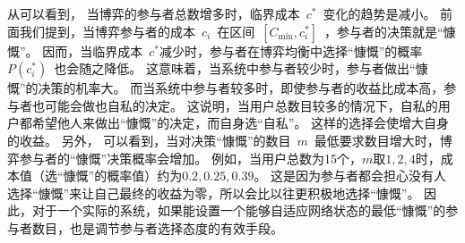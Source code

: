 从可以看到，
当博弈的参与者总数增多时，临界成本~$c^*$~变化的趋势是减小。
前面我们提到，当博弈参与者的成本~$c_i$~在区间~$ [C_{\min}, c_i^*] $~，参与者的决策就是“慷慨”。
因而，当临界成本~$c^*$减少时，参与者在博弈均衡中选择“慷慨”的概率~$P(c_i^*)$~也会随之降低。
这意味着，当系统中参与者较少时，参与者做出“慷慨”的决策的机率大。
而当系统中参与者较多时，即使参与者的收益比成本高，参与者也可能会做也自私的决定。
这说明，当用户总数目较多的情况下，自私的用户都希望他人来做出“慷慨”的决定，而自身选“自私”。
这样的选择会使增大自身的收益。
另外，
可以看到，当对决策“慷慨”的数目~$m$~最低要求数目增大时，博弈参与者的“慷慨”决策概率会增加。
例如，当用户总数为15个，$m$取$1,2,4$时，成本值（选“慷慨”的概率值）约为$0.2, 0.25, 0.39$。
这是因为参与者都会担心没有人选择“慷慨”来让自己最终的收益为零，所以会比以往更积极地选择“慷慨”。
因此，对于一个实际的系统，如果能设置一个能够自适应网络状态的最低“慷慨”的参与者数目，也是调节参与者选择态度的有效手段。

